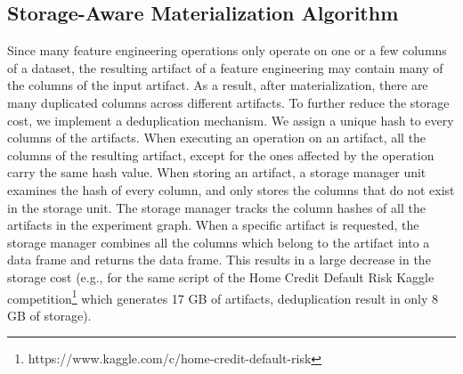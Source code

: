 %
%
\subsection{Storage-Aware Materialization Algorithm}
Since many feature engineering operations only operate on one or a few columns of a dataset, the resulting artifact of a feature engineering may contain many of the columns of the input artifact.
As a result, after materialization, there are many duplicated columns across different artifacts.
To further reduce the storage cost, we implement a deduplication mechanism.
We assign a unique hash to every columns of the artifacts.
When executing an operation on an artifact, all the columns of the resulting artifact, except for the ones affected by the operation carry the same hash value.
When storing an artifact, a storage manager unit examines the hash of every column, and only stores the columns that do not exist in the storage unit.
The storage manager tracks the column hashes of all the artifacts in the experiment graph.
When a specific artifact is requested, the storage manager combines all the columns which belong to the artifact into a data frame and returns the data frame.
This results in a large decrease in the storage cost (e.g., for the same script of the Home Credit Default Risk Kaggle competition\footnote{https://www.kaggle.com/c/home-credit-default-risk} which generates 17 GB of artifacts, deduplication result in only 8 GB of storage).

